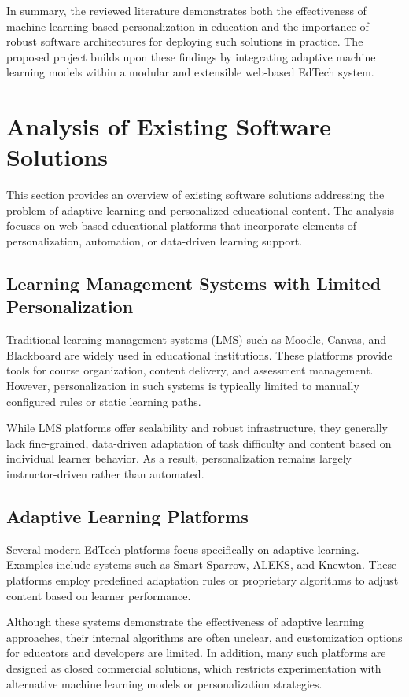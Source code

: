 \documentclass[a4paper,12pt]{extarticle}
\begin{document}
In summary, the reviewed literature demonstrates both the effectiveness of machine learning-based personalization in education and the importance of robust software architectures for deploying such solutions in practice. The proposed project builds upon these findings by integrating adaptive machine learning models within a modular and extensible web-based EdTech system.

\section{Analysis of Existing Software Solutions}

This section provides an overview of existing software solutions addressing the problem of adaptive learning and personalized educational content. The analysis focuses on web-based educational platforms that incorporate elements of personalization, automation, or data-driven learning support.

\subsection{Learning Management Systems with Limited Personalization}

Traditional learning management systems (LMS) such as Moodle, Canvas, and Blackboard are widely used in educational institutions. These platforms provide tools for course organization, content delivery, and assessment management. However, personalization in such systems is typically limited to manually configured rules or static learning paths.

While LMS platforms offer scalability and robust infrastructure, they generally lack fine-grained, data-driven adaptation of task difficulty and content based on individual learner behavior. As a result, personalization remains largely instructor-driven rather than automated.

\subsection{Adaptive Learning Platforms}

Several modern EdTech platforms focus specifically on adaptive learning. Examples include systems such as Smart Sparrow, ALEKS, and Knewton. These platforms employ predefined adaptation rules or proprietary algorithms to adjust content based on learner performance.

Although these systems demonstrate the effectiveness of adaptive learning approaches, their internal algorithms are often unclear, and customization options for educators and developers are limited. In addition, many such platforms are designed as closed commercial solutions, which restricts experimentation with alternative machine learning models or personalization strategies.
\end{document}
